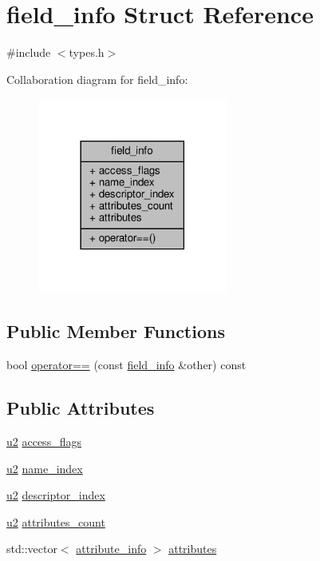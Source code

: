 \hypertarget{structfield__info}{}\section{field\+\_\+info Struct Reference}
\label{structfield__info}


{\ttfamily \#include $<$types.\+h$>$}



Collaboration diagram for field\+\_\+info\+:\nopagebreak
\begin{figure}[H]
\begin{center}
\leavevmode
\includegraphics[width=177pt]{structfield__info__coll__graph}
\end{center}
\end{figure}
\subsection*{Public Member Functions}
\begin{DoxyCompactItemize}
\item 
bool \hyperlink{structfield__info_a59e5c216711da95fa6a91aa1ca652257}{operator==} (const \hyperlink{structfield__info}{field\+\_\+info} \&other) const
\end{DoxyCompactItemize}
\subsection*{Public Attributes}
\begin{DoxyCompactItemize}
\item 
\hyperlink{types_8h_ae676e9207f57fb921dca7366b2f59c53}{u2} \hyperlink{structfield__info_aa622dc9a5b5353d2f3eb2f416dacab4b}{access\+\_\+flags}
\item 
\hyperlink{types_8h_ae676e9207f57fb921dca7366b2f59c53}{u2} \hyperlink{structfield__info_a425e3ae85badd81c67ef00acca85ad9e}{name\+\_\+index}
\item 
\hyperlink{types_8h_ae676e9207f57fb921dca7366b2f59c53}{u2} \hyperlink{structfield__info_a12dd492b7fb1d61da1ac14938d97b07f}{descriptor\+\_\+index}
\item 
\hyperlink{types_8h_ae676e9207f57fb921dca7366b2f59c53}{u2} \hyperlink{structfield__info_a83bfa4ff84a608e3dbd1c3968ebe1b80}{attributes\+\_\+count}
\item 
std\+::vector$<$ \hyperlink{structattribute__info}{attribute\+\_\+info} $>$ \hyperlink{structfield__info_adfe1d7d2b5a70e0c7a0204cb42cc68f0}{attributes}
\end{DoxyCompactItemize}


